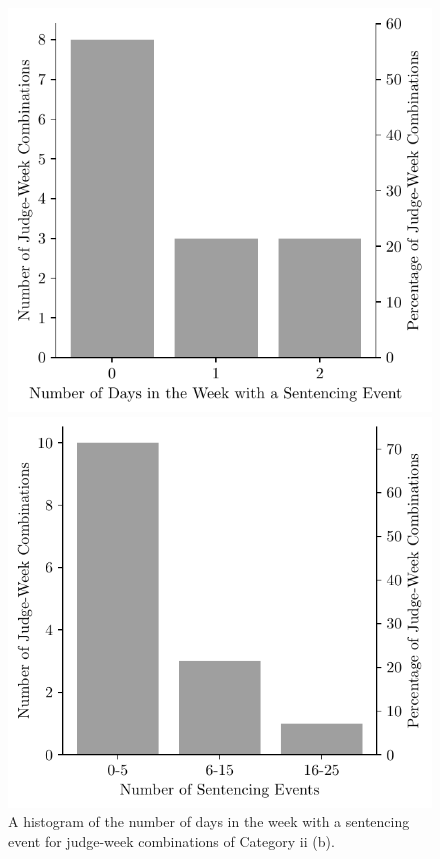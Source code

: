 \documentclass[11pt, oneside]{article}   	%
\theoremstyle{ModifiedStyle}
\begin{document}
\begin{figure}[H]
	\centering
	\begin{minipage}{.45\textwidth}
		\centering
		\hspace*{-3mm}
		\includegraphics[scale=0.72]{Figures/Histogram_of_Number_of_Days_With_Sentences_Category_11}
		\hspace{4mm}
		\vspace{-6.0mm}
		\caption{A histogram of the number of days in the week with a sentencing event for judge-week combinations of Category ii (b).}
		\label{Figure_Histogram_of_Number_of_Days_With_Sentences_Category_11}
	\end{minipage}
	\hspace{5mm}
	\begin{minipage}{0.45\textwidth}
		\centering
		\hspace*{-3mm}
		\includegraphics[scale=0.72]{Figures/Histogram_of_Sentences_This_Week_Category_11}

\end{minipage}
\end{figure}
\end{document}
